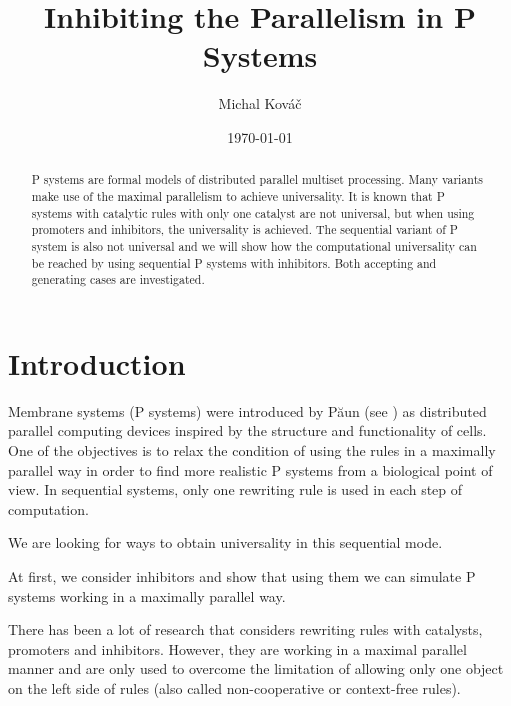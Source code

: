\documentclass[llncs,submission,copyright,creativecommons]{../lib/lncs/llncs}
\begin{document}
\title{Inhibiting the Parallelism in P Systems}
\author{Michal Kováč}
\date{\today}
\maketitle

\begin{abstract}
P systems are formal models of distributed parallel multiset processing. Many variants make use of the maximal parallelism to achieve universality.
It is known that P systems with catalytic rules with only one catalyst are not universal, but when using promoters and inhibitors, the universality is achieved.
The sequential variant of P system is also not universal and we will show how the computational universality can be reached by using sequential P systems with inhibitors. Both accepting and generating cases are investigated.
\end{abstract}

\section{Introduction}
\label{sec:introduction}


Membrane systems (P systems) were introduced by P\u{a}un (see \cite{Paun2000108}) as distributed parallel computing devices inspired by the structure and functionality of cells.
One of the objectives is to relax the condition of using the rules in a maximally parallel way in order to find more realistic P systems from a biological point of view.
In sequential systems, only one rewriting rule is used in each step of computation.


We are looking for ways to obtain universality in this sequential mode.


At first, we consider inhibitors and show that using them we can simulate P systems working in a maximally parallel way.



There has been a lot of research that considers rewriting rules with catalysts, promoters and inhibitors. However, they are working in a maximal parallel manner and are only used to overcome the limitation of allowing only one object on the left side of rules (also called non-cooperative or context-free rules).
\end{document}

